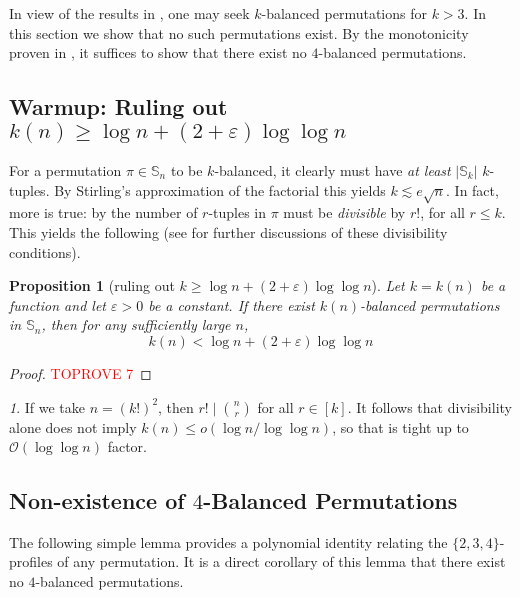\documentclass{article}
\newtheorem{proposition}[theorem]{Proposition}
\newcommand{\Sn}{\mathbb{S}_n}
\theoremstyle{remark}
\newtheorem{rem}[theorem]{\protect\remarkname}
\providecommand{\remarkname}{Remark}
\theoremstyle{plain}
\begin{document}
In view of the results in , one may seek $k$-balanced permutations for $k>3$. In this section we show that no such permutations exist. By the monotonicity proven in  , it suffices to show that there exist no $4$-balanced permutations. 

\subsection{Warmup: Ruling out \texorpdfstring{$k(n) \ge \log n + (2 + \varepsilon)\log \log n$}{k>=logn+(2+eps)loglogn}}

For a permutation $\pi \in \Sn$ to be $k$-balanced, it clearly must have \emph{at least} $|\mathbb{S}_k|$ $k$-tuples. By Stirling's approximation of the factorial this yields $k \lesssim e \sqrt{n}$. In fact, more is true: by  the number of $r$-tuples in $\pi$ must be \emph{divisible} by $r!$, for all $r \le k$. This yields the following (see \cite{cooper2008symmetric} for further discussions of these divisibility conditions).

\begin{proposition}[ruling out $k \ge \log n + (2 + \varepsilon)\log \log n$]
    \label{prop:div_rule_bal}
    Let $k=k(n)$ be a function and let $\varepsilon > 0$ be a constant. If there exist $k(n)$-balanced permutations in $\Sn$, then for any sufficiently large $n$,
    \[ k(n) < \log n + (2 + \varepsilon) \log \log n \]
\end{proposition}
\begin{proof}\textcolor{red}{TOPROVE 7}\end{proof}

\begin{rem}
If we take $n=(k!)^2$, then $r! \mid \binom{n}{r}$ for all $r \in [k]$. It follows that divisibility alone does not imply $k(n) \le o(\log n/\log \log n)$, so that  is tight up to $\mathcal{O}(\log \log n)$ factor.
\end{rem}

\subsection{Non-existence of \texorpdfstring{$4$}{4}-Balanced Permutations}

The following simple lemma provides a polynomial identity relating the $\{2,3,4\}$-profiles of any permutation. It is a direct corollary of this lemma that there exist no $4$-balanced permutations.
\end{document}
